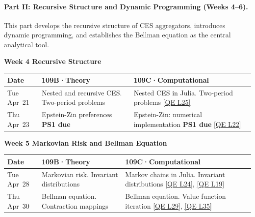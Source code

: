 \paragraph{Part II: Recursive Structure and Dynamic Programming (Weeks 4--6).}
This part develops the recursive structure of CES aggregators, introduces dynamic programming, and establishes the Bellman equation as the central analytical tool.

\vspace{0.5em}
\noindent\textbf{Week 4 \hfill Recursive Structure}
\vspace{0.3em}

\begin{tabularx}{\textwidth}{@{}p{2.1cm}YY@{}}
\toprule
\textbf{Date} & \textbf{109B\enspace·\enspace Theory} & \textbf{109C\enspace·\enspace Computational} \\
\midrule
Tue Apr~21 &
Nested and recursive CES. Two-period problems &
Nested CES in Julia. Two-period problems \newline
\href{https://julia.quantecon.org/introduction_dynamics/linear_models.html}{[QE L25]} \\[4pt]
Thu Apr~23 &
Epstein-Zin preferences \newline \textbf{PS1 due} &
Epstein-Zin: numerical implementation \newline \textbf{PS1 due} \newline
\href{https://julia.quantecon.org/introduction_dynamics/scalar_dynam.html}{[QE L22]} \\
\bottomrule
\end{tabularx}

\vspace{0.8em}
\noindent\textbf{Week 5 \hfill Markovian Risk and Bellman Equation}
\vspace{0.3em}

\begin{tabularx}{\textwidth}{@{}p{2.1cm}YY@{}}
\toprule
\textbf{Date} & \textbf{109B\enspace·\enspace Theory} & \textbf{109C\enspace·\enspace Computational} \\
\midrule
Tue Apr~28 &
Markovian risk. Invariant distributions &
Markov chains in Julia. Invariant distributions \newline
\href{https://julia.quantecon.org/introduction_dynamics/finite_markov.html}{[QE L24]},
\href{https://julia.quantecon.org/tools_and_techniques/stationary_densities.html}{[QE L19]} \\[4pt]
Thu Apr~30 &
Bellman equation. Contraction mappings &
Bellman equation. Value function iteration \newline
\href{https://julia.quantecon.org/dynamic_programming/mccall_model.html}{[QE L29]},
\href{https://julia.quantecon.org/dynamic_programming/optgrowth.html}{[QE L35]} \\
\bottomrule
\end{tabularx}

